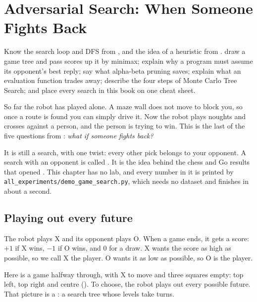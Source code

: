 \chapter{Adversarial Search: When Someone Fights Back}
\label{ch:games}

\chapterguide%
  {Know the search loop and DFS from , and the idea of a heuristic from .}
  {draw a game tree and pass scores up it by minimax; explain why a program must assume its opponent's best reply; say what alpha-beta pruning saves; explain what an evaluation function trades away; describe the four steps of Monte Carlo Tree Search; and place every search in this book on one cheat sheet.}

So far the robot has played alone. A maze wall does not move to block you, so once a route is found you can simply drive it. Now the robot plays noughts and crosses against a person, and the person is trying to win. This is the last of the five questions from : \emph{what if someone fights back?}

It is still a search, with one twist: every other pick belongs to your opponent. A search with an opponent is called . It is the idea behind the chess and Go results that opened . This chapter has no lab, and every number in it is printed by \texttt{all\_experiments/demo\_game\_search.py}, which needs no dataset and finishes in about a second.

\section{Playing out every future}

The robot plays X and its opponent plays O. When a game ends, it gets a score: $+1$ if X wins, $-1$ if O wins, and $0$ for a draw. X wants the score as high as possible, so we call X the  player. O wants it as low as possible, so O is the  player.

Here is a game halfway through, with X to move and three squares empty: top left, top right and centre (). To choose, the robot plays out every possible future. That picture is a : a search tree whose levels take turns.

\newcommand{\tttboard}[3]{%
  \begin{scope}[shift={(#1)},scale=0.27,transform shape]
    \draw[draw=UTPBlue!70,thick,fill=#3] (0,0) rectangle (3,-3);
    \draw[draw=UTPBlue!70] (1,0)--(1,-3) (2,0)--(2,-3) (0,-1)--(3,-1) (0,-2)--(3,-2);
    \foreach \sq [count=\k from 0] in {#2}{
      \pgfmathtruncatemacro{\cc}{mod(\k,3)}
      \pgfmathtruncatemacro{\rr}{int(\k/3)}
      \node[font=\Huge\bfseries\color{UTPNavy}] at (\cc+0.5,-\rr-0.5) {\sq};
    }
  \end{scope}%
}

